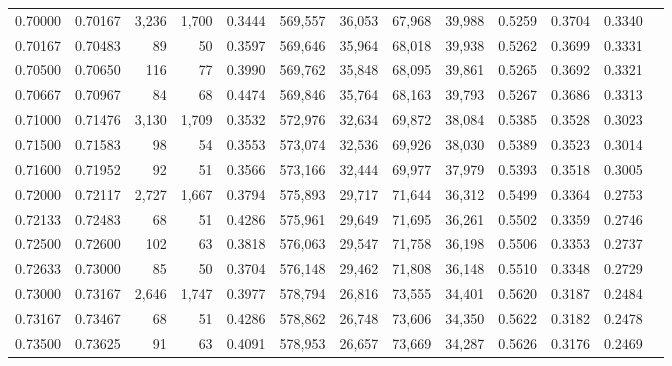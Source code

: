 \begin{tabular}{rrrrrrrrrrrrr}
0.70000 & 0.70167 &  3,236 & 1,700 &                                     0.3444 & 569,557 &  36,053 &  67,968 &  39,988 & 0.5259 & 0.3704 & 0.3340 \\
0.70167 & 0.70483 &     89 &    50 &                                     0.3597 & 569,646 &  35,964 &  68,018 &  39,938 & 0.5262 & 0.3699 & 0.3331 \\
0.70500 & 0.70650 &    116 &    77 &                                     0.3990 & 569,762 &  35,848 &  68,095 &  39,861 & 0.5265 & 0.3692 & 0.3321 \\
0.70667 & 0.70967 &     84 &    68 &                                     0.4474 & 569,846 &  35,764 &  68,163 &  39,793 & 0.5267 & 0.3686 & 0.3313 \\
0.71000 & 0.71476 &  3,130 & 1,709 &                                     0.3532 & 572,976 &  32,634 &  69,872 &  38,084 & 0.5385 & 0.3528 & 0.3023 \\
0.71500 & 0.71583 &     98 &    54 &                                     0.3553 & 573,074 &  32,536 &  69,926 &  38,030 & 0.5389 & 0.3523 & 0.3014 \\
0.71600 & 0.71952 &     92 &    51 &                                     0.3566 & 573,166 &  32,444 &  69,977 &  37,979 & 0.5393 & 0.3518 & 0.3005 \\
0.72000 & 0.72117 &  2,727 & 1,667 &                                     0.3794 & 575,893 &  29,717 &  71,644 &  36,312 & 0.5499 & 0.3364 & 0.2753 \\
0.72133 & 0.72483 &     68 &    51 &                                     0.4286 & 575,961 &  29,649 &  71,695 &  36,261 & 0.5502 & 0.3359 & 0.2746 \\
0.72500 & 0.72600 &    102 &    63 &                                     0.3818 & 576,063 &  29,547 &  71,758 &  36,198 & 0.5506 & 0.3353 & 0.2737 \\
0.72633 & 0.73000 &     85 &    50 &                                     0.3704 & 576,148 &  29,462 &  71,808 &  36,148 & 0.5510 & 0.3348 & 0.2729 \\
0.73000 & 0.73167 &  2,646 & 1,747 &                                     0.3977 & 578,794 &  26,816 &  73,555 &  34,401 & 0.5620 & 0.3187 & 0.2484 \\
0.73167 & 0.73467 &     68 &    51 &                                     0.4286 & 578,862 &  26,748 &  73,606 &  34,350 & 0.5622 & 0.3182 & 0.2478 \\
0.73500 & 0.73625 &     91 &    63 &                                     0.4091 & 578,953 &  26,657 &  73,669 &  34,287 & 0.5626 & 0.3176 & 0.2469 \\

\end{tabular}
